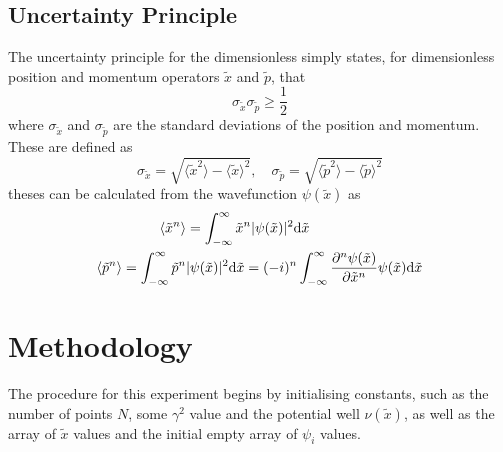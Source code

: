 \documentclass[10pt,a4paper]{article}
\theoremstyle{definition}
\theoremstyle{remark}
\begin{document}
\subsection{Uncertainty Principle}
\label{sec: uncertainty_principle}
The uncertainty principle for the dimensionless simply states, for dimensionless position and momentum operators $\tilde{x}$ and $\tilde{p}$, that
\begin{equation}
    \sigma_{\tilde{x}}\sigma_{\tilde{p}} \geq \frac{1}{2}
\end{equation}
where $\sigma_{\tilde{x}}$ and $\sigma_{\tilde{p}}$ are the standard deviations of the position and momentum. These are defined as
\begin{equation}
    \sigma_{\tilde{x}} = \sqrt{\langle\tilde{x}^2\rangle - \langle\tilde{x}\rangle^2},\quad \sigma_{\tilde{p}} = \sqrt{\langle\tilde{p}^2\rangle - \langle\tilde{p}\rangle^2}
\end{equation}
theses can be calculated from the wavefunction $\psi(\tilde{x})$ as
\begin{align}
    \braket{\tilde{x}^n} &= \int_{-\infty}^{\infty}\tilde{x}^n|\psi(\tilde{x})|^2\mathrm{d}\tilde{x}\\
    \braket{\tilde{p}^n} = \int_{-\infty}^{\infty}\tilde{p}^n&|\psi(\tilde{x})|^2\mathrm{d}\tilde{x} = (-i)^n\int_{-\infty}^{\infty}\frac{\partial^n\psi(\tilde{x})}{\partial\tilde{x}^n}\psi(\tilde{x})\mathrm{d}\tilde{x}
\end{align}
\section{Methodology}
The procedure for this experiment begins by initialising constants, such as the number of points $N$, some $\gamma^2$ value and the potential well $\nu(\tilde{x})$, as well as the array of $\tilde{x}$ values and the initial empty array of $\psi_i$ values.
\end{document}
